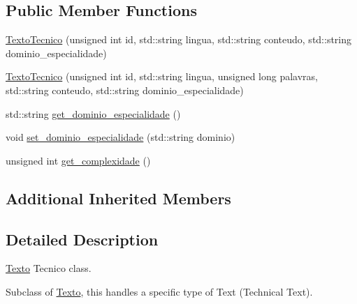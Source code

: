 \subsection*{Public Member Functions}
\begin{DoxyCompactItemize}
\item 
\hyperlink{class_texto_tecnico_a4c770469d3a65f750b4551bef18629a9}{Texto\-Tecnico} (unsigned int id, std\-::string lingua, std\-::string conteudo, std\-::string dominio\-\_\-especialidade)
\item 
\hyperlink{class_texto_tecnico_adc11a5c4366f90c1f22fc986c4bc2131}{Texto\-Tecnico} (unsigned int id, std\-::string lingua, unsigned long palavras, std\-::string conteudo, std\-::string dominio\-\_\-especialidade)
\item 
std\-::string \hyperlink{class_texto_tecnico_af0541bfc3a8fc861eb13abba28a6768d}{get\-\_\-dominio\-\_\-especialidade} ()
\item 
void \hyperlink{class_texto_tecnico_af66d0b574c0e3316870fb8fdc3223c74}{set\-\_\-dominio\-\_\-especialidade} (std\-::string dominio)
\item 
unsigned int \hyperlink{class_texto_tecnico_a032479cf2086b94534b5d41b94440c2b}{get\-\_\-complexidade} ()
\end{DoxyCompactItemize}
\subsection*{Additional Inherited Members}


\subsection{Detailed Description}
\hyperlink{class_texto}{Texto} Tecnico class. 

Subclass of \hyperlink{class_texto}{Texto}, this handles a specific type of Text (Technical Text). 

